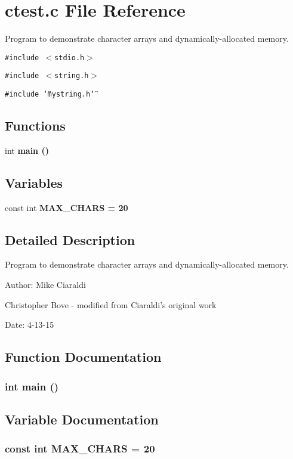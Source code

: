 \section{ctest.c File Reference}
\label{ctest_8c}
Program to demonstrate character arrays and dynamically-allocated memory. 

{\tt \#include $<$stdio.h$>$}\par
{\tt \#include $<$string.h$>$}\par
{\tt \#include \char`\"{}mystring.h\char`\"{}}\par
\subsection*{Functions}
\begin{CompactItemize}
\item 
int \bf{main} ()
\end{CompactItemize}
\subsection*{Variables}
\begin{CompactItemize}
\item 
const int \bf{MAX\_\-CHARS} = 20
\end{CompactItemize}


\subsection{Detailed Description}
Program to demonstrate character arrays and dynamically-allocated memory. 

\begin{Desc}
\item[Author:]Mike Ciaraldi 

Christopher Bove - modified from Ciaraldi's original work \end{Desc}
\begin{Desc}
\item[Date:]4-13-15 \end{Desc}


\subsection{Function Documentation}
\subsubsection{\setlength{\rightskip}{0pt plus 5cm}int main ()}\label{ctest_8c_e66f6b31b5ad750f1fe042a706a4e3d4}




\subsection{Variable Documentation}
\subsubsection{\setlength{\rightskip}{0pt plus 5cm}const int \bf{MAX\_\-CHARS} = 20}\label{ctest_8c_4d1d0bd6a22f061caf036105657aab29}


